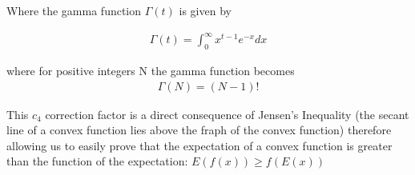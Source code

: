 \documentclass{article}
\begin{document}
Where the gamma function $\Gamma(t)$ is given by

\begin{align}
  \Gamma(t) = \int_{0}^{\infty} x^{t-1}e^{-x}dx
\end{align}

where for positive integers N the gamma function becomes
\begin{align}
  \Gamma(N)=(N-1)!
\end{align}

This $c_4$ correction factor is a direct consequence of Jensen's Inequality (the secant line of a convex function lies above the fraph of the convex function) therefore allowing us to easily prove that the expectation of a convex
function is greater than the function of the expectation: $E(f(x)) \geq f(E(x))$
\end{document}

